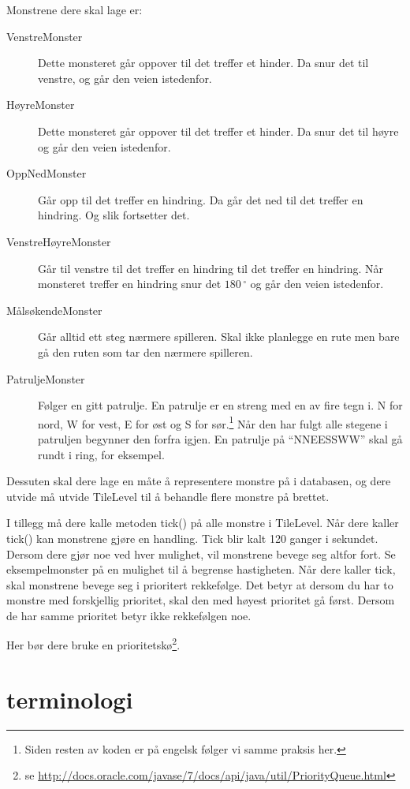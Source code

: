 \documentclass[norsk]{article}
\begin{document}
Monstrene dere skal lage er:
\begin{description}
\item [VenstreMonster] Dette monsteret går oppover til det treffer et hinder. Da snur det til venstre, og går den veien istedenfor.
\item [HøyreMonster] Dette monsteret går oppover til det treffer et hinder. Da snur det til høyre og går den veien istedenfor.
\item [OppNedMonster] Går opp til det treffer en hindring. Da går det ned til det treffer en hindring. Og slik fortsetter det.
\item [VenstreHøyreMonster] Går til venstre til det treffer en hindring til det treffer en hindring. Når monsteret treffer en hindring snur det $180\,^{\circ}$ og går den veien istedenfor.
\item [MålsøkendeMonster] Går alltid ett steg nærmere spilleren. Skal ikke planlegge en rute men bare gå den ruten som tar den nærmere spilleren.
\item [PatruljeMonster] Følger en gitt patrulje. En patrulje er en streng med en av fire tegn i. N for nord, W for vest, E for øst og S for sør.\footnote{Siden resten av koden er på engelsk følger vi samme praksis her.} Når den har fulgt alle stegene i patruljen begynner den forfra igjen. En patrulje på ``NNEESSWW'' skal gå rundt i ring, for eksempel.
\end{description}

Dessuten skal dere lage en måte å representere monstre på i databasen, og dere utvide må utvide TileLevel til å behandle flere monstre på brettet.

I tillegg må dere kalle metoden tick() på alle monstre i TileLevel.
Når dere kaller tick() kan monstrene gjøre en handling.
Tick blir kalt 120 ganger i sekundet.
Dersom dere gjør noe ved hver mulighet, vil monstrene bevege seg altfor fort.
Se eksempelmonster på en mulighet til å begrense hastigheten.
Når dere kaller tick, skal monstrene bevege seg i prioritert rekkefølge.
Det betyr at dersom du har to monstre med forskjellig prioritet, skal den med høyest prioritet gå først.
Dersom de har samme prioritet betyr ikke rekkefølgen noe.

Her bør dere bruke en prioritetskø\footnote{se \url{http://docs.oracle.com/javase/7/docs/api/java/util/PriorityQueue.html}}.

\section{terminologi}
\end{document}
